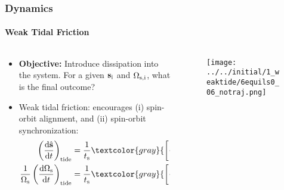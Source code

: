 \documentclass[dvipsnames, 9pt]{beamer}
\newcommand*{\rd}[2]{\frac{\mathrm{d}#1}{\mathrm{d}#2}}
\newcommand*{\bm}[1]{\boldsymbol{\mathbf{#1}}}
\newcommand*{\uv}[1]{\hat{\bm{#1}}}
\newcommand*{\p}[1]{\left(#1\right)}
\newcommand*{\s}[1]{\left[#1\right]}
\begin{document}
\begin{frame}
    \frametitle{Dynamics}
    \framesubtitle{Weak Tidal Friction}

    \begin{columns}
        \begin{column}{0.5\columnwidth}
            \begin{itemize}
                \item \textbf{Objective:} Introduce dissipation into the system.
                    For a given $\bm{s}_{\rm i}$ and $\Omega_{\rm s, i}$, what
                    is the final outcome?

                \item Weak tidal friction: encourages (i) spin-orbit alignment,
                    and (ii) spin-orbit synchronization:
                \begin{align*}
                    \p{\rd{\uv{s}}{t}}_{\rm tide} &= \frac{1}{t_{\rm s}}
                        \textcolor{gray}{\s{\frac{2n}{\Omega_{\rm s}} - \p{\uv{s} \cdot \uv{l}}}
                        \uv{s} \times \p{\uv{l} \times
                        \uv{s}}},\\
                    \frac{1}{\Omega_{\rm s}}\p{\rd{\Omega_{\rm s}}{t}}_{\rm
                            tide}
                        &= \frac{1}{t_{\rm s}} \textcolor{gray}
                        {\s{\frac{2n}{\Omega_{\rm
                        s}}\p{\uv{s} \cdot \uv{l}} - 1 - \p{\uv{s} \cdot
                        \uv{l}}^2}}.
                \end{align*}
            \end{itemize}
        \end{column}
        \begin{column}{0.5\columnwidth}
            \begin{figure}
                \centering
                \texttt{[image: ../../initial/1\_weaktide/6equils0\_06\_notraj.png]}
            \end{figure}
        \end{column}
    \end{columns}
\end{frame}
\end{document}
